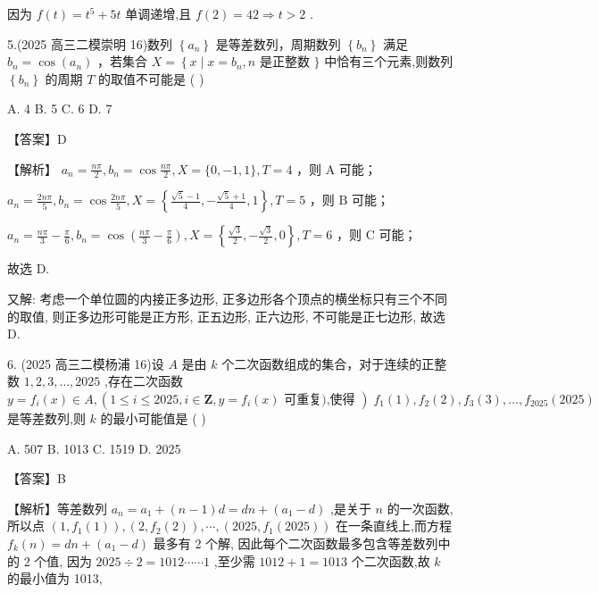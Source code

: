 \documentclass[10pt]{article}
\newcommand*\circled[1]{\tikz[baseline=(char.base)]{\node[shape=circle,draw,inner sep=1.5pt] (char) {\small #1};}}
\begin{document}
因为 \(f\left( t\right)  = {t}^{5} + {5t}\) 单调递增,且 \(f\left( 2\right)  = {42} \Rightarrow  t > 2\) .

5.(2025 高三二模崇明 16)数列 \(\left\{  {a}_{n}\right\}\) 是等差数列，周期数列 \(\left\{  {b}_{n}\right\}\) 满足 \({b}_{n} = \cos \left( {a}_{n}\right)\) ，若集合 \(X = \left\{  {x \mid  x = {b}_{n},n}\right.\) 是正整数 \(\}\) 中恰有三个元素,则数列 \(\left\{  {b}_{n}\right\}\) 的周期 \(T\) 的取值不可能是 ( )

A. 4 B. 5 C. 6 D. 7

【答案】D

【解析】 \circled{1}  \({a}_{n} = \frac{n\pi }{2},{b}_{n} = \cos \frac{n\pi }{2},X = \{ 0, - 1,1\} ,T = 4\) ，则 \(\mathrm{A}\) 可能；

 \circled{2}  \({a}_{n} = \frac{2n\pi }{5},{b}_{n} = \cos \frac{2n\pi }{5},X = \left\{  {\frac{\sqrt{5} - 1}{4}, - \frac{\sqrt{5} + 1}{4},1}\right\}  ,T = 5\) ，则 \(\mathrm{B}\) 可能；

 \circled{3}  \({a}_{n} = \frac{n\pi }{3} - \frac{\pi }{6},{b}_{n} = \cos \left( {\frac{n\pi }{3} - \frac{\pi }{6}}\right) ,X = \left\{  {\frac{\sqrt{3}}{2}, - \frac{\sqrt{3}}{2},0}\right\}  ,T = 6\) ，则 \(\mathrm{C}\) 可能；

故选 D.

又解: 考虑一个单位圆的内接正多边形, 正多边形各个顶点的横坐标只有三个不同的取值, 则正多边形可能是正方形, 正五边形, 正六边形, 不可能是正七边形, 故选 D.

6. (2025 高三二模杨浦 16)设 \(A\) 是由 \(k\) 个二次函数组成的集合，对于连续的正整数 \(1,2,3,\ldots ,{2025}\) ,存在二次函数 \(y = {f}_{i}\left( x\right)  \in  A,\left( {1 \leq  i \leq  {2025},i \in  \mathbf{Z},y = {f}_{i}\left( x\right) \text{ 可重复),使得 }}\right) \; {f}_{1}\left( 1\right) ,{f}_{2}\left( 2\right) ,{f}_{3}\left( 3\right) ,\ldots ,{f}_{2025}\left( {2025}\right)\) 是等差数列,则 \(k\) 的最小可能值是 ( )

A. 507 B. 1013 C. 1519 D. 2025

【答案】B

【解析】等差数列 \({a}_{n} = {a}_{1} + \left( {n - 1}\right) d = {dn} + \left( {{a}_{1} - d}\right)\) ,是关于 \(n\) 的一次函数,所以点 \(\left( {1,{f}_{1}\left( 1\right) }\right) ,\left( {2,{f}_{2}\left( 2\right) }\right) ,\cdots ,\left( {{2025},{f}_{1}\left( {2025}\right) }\right)\) 在一条直线上,而方程 \({f}_{k}\left( n\right)  = {dn} + \left( {{a}_{1} - d}\right)\) 最多有 2 个解, 因此每个二次函数最多包含等差数列中的 2 个值, 因为 \({2025} \div  2 = {1012}\cdots \cdots 1\) ,至少需 \({1012} + 1 = {1013}\) 个二次函数,故 \(k\) 的最小值为 1013,
\end{document}
